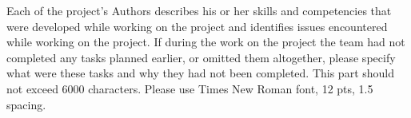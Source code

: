 Each of the project's Authors describes his or her skills and competencies that were developed while working on the
project and identifies issues encountered while working on the project.
If during the work on the project the team had not completed any tasks planned earlier, or omitted them altogether,
please specify what were these tasks and why they had not been completed.
This part should not exceed 6000 characters.
Please use Times New Roman font, 12 pts, 1.5 spacing.